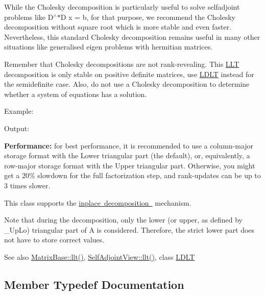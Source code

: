 While the Cholesky decomposition is particularly useful to solve selfadjoint problems like D$^\wedge$$\ast$D x = b, for that purpose, we recommend the Cholesky decomposition without square root which is more stable and even faster. Nevertheless, this standard Cholesky decomposition remains useful in many other situations like generalised eigen problems with hermitian matrices.

Remember that Cholesky decompositions are not rank-\/revealing. This \mbox{\hyperlink{class_eigen_1_1_l_l_t}{L\+LT}} decomposition is only stable on positive definite matrices, use \mbox{\hyperlink{class_eigen_1_1_l_d_l_t}{L\+D\+LT}} instead for the semidefinite case. Also, do not use a Cholesky decomposition to determine whether a system of equations has a solution.

Example\+: 
\begin{DoxyCodeInclude}{0}
\end{DoxyCodeInclude}
 Output\+: 
\begin{DoxyVerbInclude}
\end{DoxyVerbInclude}


{\bfseries{Performance\+:}} for best performance, it is recommended to use a column-\/major storage format with the Lower triangular part (the default), or, equivalently, a row-\/major storage format with the Upper triangular part. Otherwise, you might get a 20\% slowdown for the full factorization step, and rank-\/updates can be up to 3 times slower.

This class supports the \mbox{\hyperlink{}{inplace decomposition }} mechanism.

Note that during the decomposition, only the lower (or upper, as defined by \+\_\+\+Up\+Lo) triangular part of A is considered. Therefore, the strict lower part does not have to store correct values.

\begin{DoxySeeAlso}{See also}
\mbox{\hyperlink{class_eigen_1_1_matrix_base_a90c45f7a30265df792d5aeaddead2635}{Matrix\+Base\+::llt()}}, \mbox{\hyperlink{class_eigen_1_1_self_adjoint_view_a405e810491642a7f7b785f2ad6f93619}{Self\+Adjoint\+View\+::llt()}}, class \mbox{\hyperlink{class_eigen_1_1_l_d_l_t}{L\+D\+LT}} 
\end{DoxySeeAlso}


\subsection{Member Typedef Documentation}
\mbox{\label{class_eigen_1_1_l_l_t_ac7a64274814fa76e8b1e9e945546037f}} 
